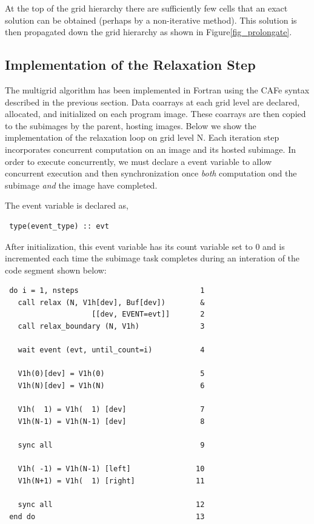 At the top of the grid hierarchy there are sufficiently few cells that an exact solution can be
obtained (perhaps by a non-iterative method).  This solution is then propagated down the
grid hierarchy as shown in Figure\ref{fig_prolongate}.

\subsection{Implementation of the Relaxation Step}

The multigrid algorithm has been implemented in Fortran using the CAFe
syntax described in the previous section. Data coarrays at each grid
level are declared, allocated, and initialized on each program image.
These coarrays are then copied to the subimages by the parent, hosting
images.  Below we show the implementation of the relaxation loop on
grid level N.  Each iteration step incorporates concurrent computation
on an image and its hosted subimage.  In order to execute
concurrently, we must declare a event variable to allow concurrent
execution and then synchronization once \emph{both} computation ond
the subimage \emph{and} the image have completed.

The event variable is declared as,
\small
\begin{verbatim}
 type(event_type) :: evt
\end{verbatim}
\normalsize
After initialization, this event variable has its count variable set to 0 and is incremented
each time the subimage task completes during an interation of the code segment shown below:
\small
\begin{verbatim}
 do i = 1, nsteps                            1
   call relax (N, V1h[dev], Buf[dev])        &
                    [[dev, EVENT=evt]]       2
   call relax_boundary (N, V1h)              3

   wait event (evt, until_count=i)           4

   V1h(0)[dev] = V1h(0)                      5
   V1h(N)[dev] = V1h(N)                      6

   V1h(  1) = V1h(  1) [dev]                 7
   V1h(N-1) = V1h(N-1) [dev]                 8

   sync all                                  9

   V1h( -1) = V1h(N-1) [left]               10
   V1h(N+1) = V1h(  1) [right]              11

   sync all                                 12
 end do                                     13
\end{verbatim}
\normalsize

